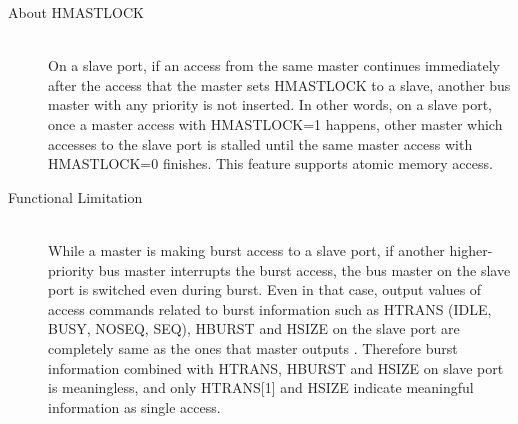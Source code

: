 \begin{description}

    \item[About HMASTLOCK]\mbox{}\\
         On a slave port, if an access from the same master continues immediately after the access that the master sets HMASTLOCK to a slave, another bus master with any priority is not inserted. In other words, on a slave port, once a master access with HMASTLOCK=1 happens, other master which accesses to the slave port is stalled until the same master access with HMASTLOCK=0 finishes. This feature supports atomic memory access.

    \item[Functional Limitation]\mbox{}\\
        While a master is making burst access to a slave port, if another higher-priority bus master interrupts the burst access, the bus master on the slave port is switched even during burst. Even in that case, output values of access commands related to burst information such as HTRANS (IDLE, BUSY, NOSEQ, SEQ), HBURST and HSIZE on the slave port are completely same as the ones that master outputs . Therefore burst information combined with HTRANS, HBURST and HSIZE on slave port is meaningless, and only HTRANS[1] and HSIZE indicate meaningful information as single access.

\end{description}

